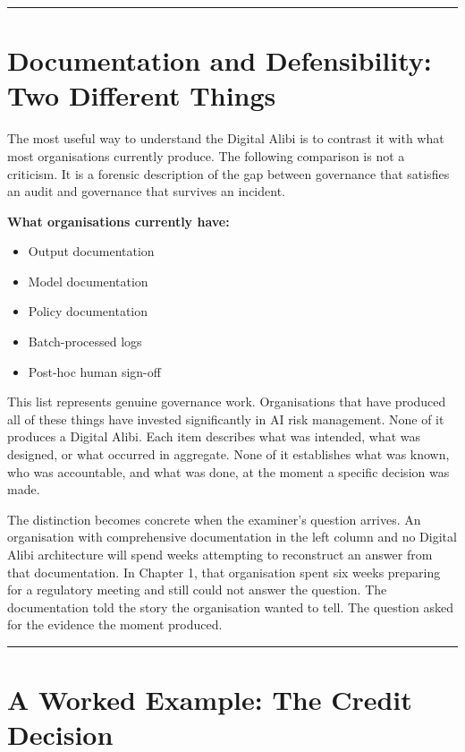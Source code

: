 \begin{center}\rule{0.5\linewidth}{0.5pt}\end{center}

\section{Documentation and Defensibility: Two Different Things}

The most useful way to understand the Digital Alibi is to contrast it with what most organisations currently produce. The following comparison is not a criticism. It is a forensic description of the gap between governance that satisfies an audit and governance that survives an incident.

\textbf{What organisations currently have:}

\begin{itemize}
\tightlist
\item
  Output documentation
\item
  Model documentation
\item
  Policy documentation
\item
  Batch-processed logs
\item
  Post-hoc human sign-off
\end{itemize}

This list represents genuine governance work. Organisations that have produced all of these things have invested significantly in AI risk management. None of it produces a Digital Alibi. Each item describes what was intended, what was designed, or what occurred in aggregate. None of it establishes what was known, who was accountable, and what was done, at the moment a specific decision was made.

The distinction becomes concrete when the examiner's question arrives. An organisation with comprehensive documentation in the left column and no Digital Alibi architecture will spend weeks attempting to reconstruct an answer from that documentation. In Chapter 1, that organisation spent six weeks preparing for a regulatory meeting and still could not answer the question. The documentation told the story the organisation wanted to tell. The question asked for the evidence the moment produced.

\begin{center}\rule{0.5\linewidth}{0.5pt}\end{center}

\section{A Worked Example: The Credit Decision}


